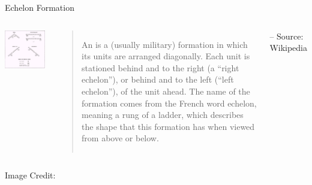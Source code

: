 \documentclass[xcolor=dvipsnames,aspectratio=169,t]{beamer}
\begin{document}
\begin{frame}{Echelon Formation}

  \begin{columns}[T]
    \column{0.4\tw}
    
  \includegraphics[width=0.95\tw]{images/fig-echelon-troops.jpg}

  \column{0.6\tw}
  
\begin{quote}
  An  is a (usually military) formation in which its units are arranged diagonally. Each unit is stationed behind and to the right (a ``right echelon''), or behind and to the left (``left echelon''), of the unit ahead. The name of the formation comes from the French word echelon, meaning a rung of a ladder, which describes the shape that this formation has when viewed from above or below.
\end{quote}
\hspace*{7em} -- Source: Wikipedia

\end{columns}

\vfill


{\footnotesize Image Credit:  }
  
  \end{frame}
\end{document}
